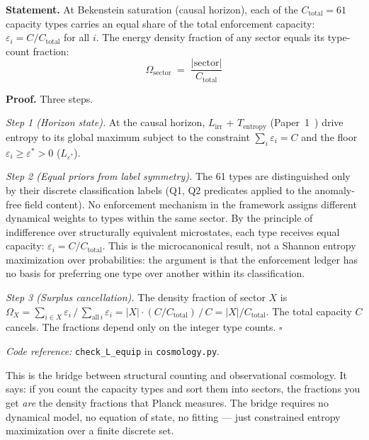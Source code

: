 \documentclass[11pt]{article}
\newcommand{\coderef}[2]{\smallskip\noindent\textit{Code reference:} \texttt{#1} in \texttt{#2}.}
\begin{document}
\begin{tcolorbox}[apfbox, title={$L_{\mathrm{equip}}$ (Horizon Equipartition)}]
\textbf{Statement.}  At Bekenstein saturation (causal horizon), each of the $C_{\mathrm{total}} = 61$ capacity types carries an equal share of the total enforcement capacity: $\varepsilon_i = C/C_{\mathrm{total}}$ for all $i$.  The energy density fraction of any sector equals its type-count fraction:
\begin{equation}
\Omega_{\mathrm{sector}} \;=\; \frac{|\mathrm{sector}|}{C_{\mathrm{total}}}
\label{eq:omega_equip}
\end{equation}

\smallskip\noindent\textbf{Proof.}  Three steps.

\textit{Step 1 (Horizon state).}  At the causal horizon, $L_{\mathrm{irr}}$ + $T_{\mathrm{entropy}}$ (Paper~1~\cite{BrookePaper1}) drive entropy to its global maximum subject to the constraint $\sum_i \varepsilon_i = C$ and the floor $\varepsilon_i \ge \varepsilon^* > 0$ ($L_{\varepsilon^*}$).

\textit{Step 2 (Equal priors from label symmetry).}  The 61 types are distinguished only by their discrete classification labels (Q1, Q2 predicates applied to the anomaly-free field content).  No enforcement mechanism in the framework assigns different dynamical weights to types within the same sector.  By the principle of indifference over structurally equivalent microstates, each type receives equal capacity: $\varepsilon_i = C / C_{\mathrm{total}}$.  This is the microcanonical result, not a Shannon entropy maximization over probabilities: the argument is that the enforcement ledger has no basis for preferring one type over another within its classification.

\textit{Step 3 (Surplus cancellation).}  The density fraction of sector $X$ is $\Omega_X = \sum_{i \in X} \varepsilon_i \,/\, \sum_{\mathrm{all}\,i} \varepsilon_i = |X| \cdot (C/C_{\mathrm{total}}) \,/\, C = |X|/C_{\mathrm{total}}$.  The total capacity $C$ cancels.  The fractions depend only on the integer type counts.  $\square$

\coderef{check\_L\_equip}{cosmology.py}
\end{tcolorbox}

This is the bridge between structural counting and observational cosmology.  It says: if you count the capacity types and sort them into sectors, the fractions you get \emph{are} the density fractions that Planck measures.  The bridge requires no dynamical model, no equation of state, no fitting --- just constrained entropy maximization over a finite discrete set.
\end{document}
